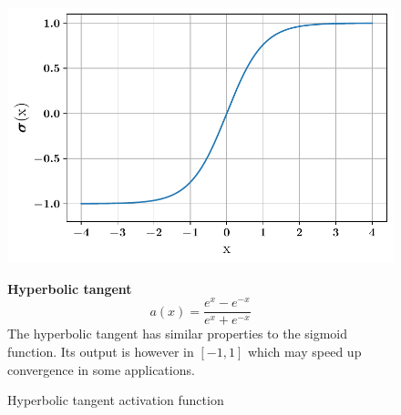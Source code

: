 \begin{figure}[!h]
\begin{minipage}{0.45\textwidth}
    \centering
\includegraphics[width=\textwidth]{images/networks/act_tanh.pdf}
\caption{Hyperbolic tangent activation function}
    \label{fig:act_tanh}
\end{minipage}
\hfill
\begin{minipage}{0.5\textwidth}
    \textbf{Hyperbolic tangent}
   \begin{equation}
       a(x) =\frac{e^x-e^{-x}}{e^x+e^{-x}}
   \end{equation}
The hyperbolic tangent has similar properties to the sigmoid function. Its output is however in $[-1,1]$ which may speed up convergence in some applications.
\end{minipage}
\end{figure}